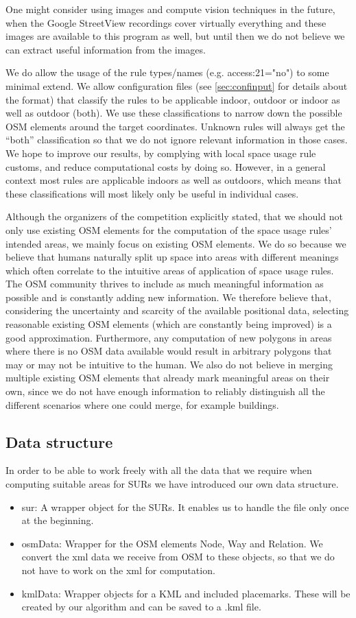 \documentclass[11pt,fleqn]{book} %
\begin{document}
One might consider using images and compute vision techniques in the future, when the Google StreetView recordings cover virtually everything and these images are available to this program as well, but until then we do not believe we can extract useful information from the images.

We do allow the usage of the rule types/names (e.g. access:21="no") to some minimal extend. We allow configuration files (see \ref{sec:confinput} for details about the format) that classify the rules to be applicable indoor, outdoor or indoor as well as outdoor (both). We use these classifications to narrow down the possible OSM elements around the target coordinates. Unknown rules will always get the ``both'' classification so that we do not ignore relevant information in those cases. We hope to improve our results, by complying with local space usage rule customs, and reduce computational costs by doing so. However, in a general context most rules are applicable indoors as well as outdoors, which means that these classifications will most likely only be useful in individual cases. 

Although the organizers of the competition explicitly stated, that we should not only use existing OSM elements for the computation of the space usage rules' intended areas, we mainly focus on existing OSM elements. We do so because we believe that humans naturally split up space into areas with different meanings which often correlate to the intuitive areas of application of space usage rules. The OSM community thrives to include as much meaningful information as possible and is constantly adding new information. We therefore believe that, considering the uncertainty and scarcity of the available positional data, selecting reasonable existing OSM elements (which are constantly being improved) is a good approximation. Furthermore, any computation of new polygons in areas where there is no OSM data available would result in arbitrary polygons that may or may not be intuitive to the human. We also do not believe in merging multiple existing OSM elements that already mark meaningful areas on their own, since we do not have enough information to reliably distinguish all the different scenarios where one could merge, for example buildings.


\subsection{Data structure}
In order to be able to work freely with all the data that we require when computing suitable areas for SURs we have introduced our own data structure.
\begin{itemize}
	\item sur: A wrapper object for the SURs. It enables us to handle the file only once at the beginning.
	\item osmData: Wrapper for the OSM elements Node, Way and Relation. We convert the xml data we receive from OSM to these objects, so that we do not have to work on the xml for computation.
	\item kmlData: Wrapper objects for a KML and included placemarks. These will be created by our algorithm and can be saved to a .kml file.
\end{itemize}
\end{document}
